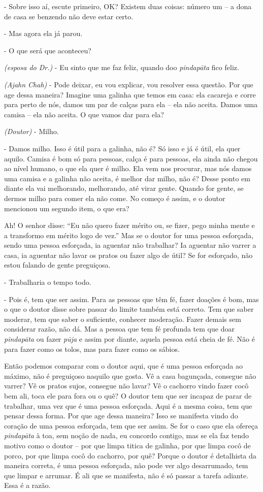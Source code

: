 - Sobre isso aí, escute primeiro, OK? Existem duas coisas: número
um – a dona de casa se benzendo não deve estar certo.

- Mas agora ela já parou.

- O que será que aconteceu?

\textit{(esposa do Dr.)} - Eu sinto que me faz feliz, quando doo
\textit{pindapāta} fico feliz.

\textit{(Ajahn Chah)} - Pode deixar, eu vou explicar, vou resolver
essa questão. Por que age dessa maneira? Imagine uma galinha que temos
em casa: ela cacareja e corre para perto de nós, damos um par de calças
para ela – ela não aceita. Damos uma camisa – ela não aceita. O que
vamos dar para ela? 

\textit{(Doutor)} - Milho.

- Damos milho. Isso é útil para a galinha, não é? Só isso e já é
útil, ela quer aquilo. Camisa é bom só para pessoas, calça é para
pessoas, ela ainda não chegou ao nível humano, o que ela quer é milho.
Ela vem nos procurar, mas nós damos uma camisa e a galinha não aceita,
é melhor dar milho, não é? Desse ponto em diante ela vai melhorando,
melhorando, até virar gente. Quando for gente, se dermos milho para
comer ela não come. No começo é assim, e o doutor mencionou um segundo
item, o que era?

Ah! O senhor disse: “Eu não quero fazer mérito ou, se fizer, pego
minha mente e a transformo em mérito logo de vez.” Mas se o doutor for
uma pessoa esforçada, sendo uma pessoa esforçada, ia aguentar não
trabalhar? Ia aguentar não varrer a casa, ia aguentar não lavar os
pratos ou fazer algo de útil? Se for esforçado, não estou falando de
gente preguiçosa. 

- Trabalharia o tempo todo.

- Pois é, tem que ser assim. Para as pessoas que têm fé, fazer
doações é bom, mas o que o doutor disse sobre passar do limite também
está correto. Tem que saber moderar, tem que saber o suficiente,
conhecer moderação. Fazer demais sem considerar razão, não dá. Mas a
pessoa que tem fé profunda tem que doar \textit{pindapāta} ou fazer
\textit{pūja} e assim por diante, aquela pessoa está cheia de fé. Não
é para fazer como os tolos, mas para fazer como os sábios. 

Então podemos comparar com o doutor aqui, que é uma pessoa esforçada
ao máximo, não é preguiçoso naquilo que gosta. Vê a casa bagunçada,
consegue não varrer? Vê os pratos sujos, consegue não lavar? Vê o
cachorro vindo fazer cocô bem ali, toca ele para fora ou o quê? O
doutor tem que ser incapaz de parar de trabalhar, uma vez que é uma
pessoa esforçada. Aqui é a mesma coisa, tem que pensar dessa forma. Por
que age dessa maneira? Isso se manifesta vindo do coração de uma pessoa
esforçada, tem que ser assim. Se for o caso que ela ofereça
\textit{pindapāta} à toa, sem noção de nada, eu concordo contigo, mas
se ela faz tendo motivo como o doutor – por que limpa titica de
galinha, por que limpa cocô de porco, por que limpa cocô do cachorro,
por quê? Porque o doutor é detalhista da maneira correta, é uma pessoa
esforçada, não pode ver algo desarrumado, tem que limpar e arrumar. É
ali que se manifesta, não é só passar a tarefa adiante. Essa é a razão.


